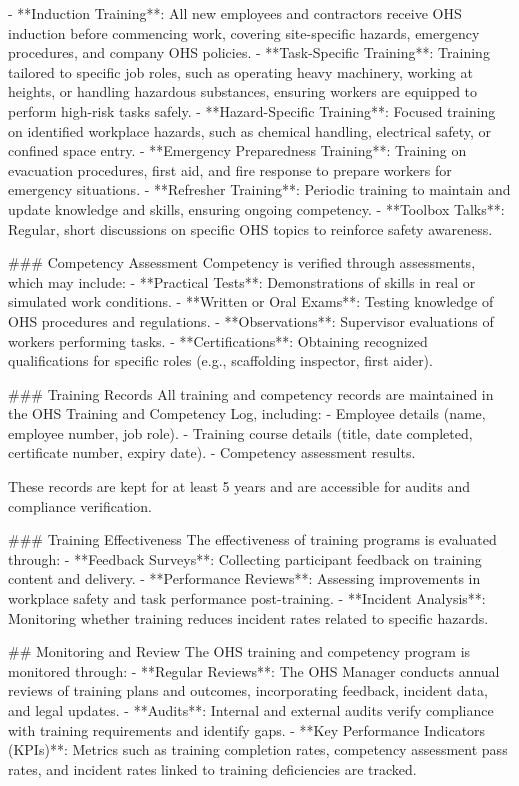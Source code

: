 \documentclass[11pt]{article}
\begin{document}
\begin{itemize}
{\begin{itemize}
- **Induction Training**: All new employees and contractors receive OHS induction before commencing work, covering site-specific hazards, emergency procedures, and company OHS policies.
- **Task-Specific Training**: Training tailored to specific job roles, such as operating heavy machinery, working at heights, or handling hazardous substances, ensuring workers are equipped to perform high-risk tasks safely.
- **Hazard-Specific Training**: Focused training on identified workplace hazards, such as chemical handling, electrical safety, or confined space entry.
- **Emergency Preparedness Training**: Training on evacuation procedures, first aid, and fire response to prepare workers for emergency situations.
- **Refresher Training**: Periodic training to maintain and update knowledge and skills, ensuring ongoing competency.
- **Toolbox Talks**: Regular, short discussions on specific OHS topics to reinforce safety awareness.

### Competency Assessment
Competency is verified through assessments, which may include:
- **Practical Tests**: Demonstrations of skills in real or simulated work conditions.
- **Written or Oral Exams**: Testing knowledge of OHS procedures and regulations.
- **Observations**: Supervisor evaluations of workers performing tasks.
- **Certifications**: Obtaining recognized qualifications for specific roles (e.g., scaffolding inspector, first aider).

### Training Records
All training and competency records are maintained in the OHS Training and Competency Log, including:
- Employee details (name, employee number, job role).
- Training course details (title, date completed, certificate number, expiry date).
- Competency assessment results.

These records are kept for at least 5 years and are accessible for audits and compliance verification.

### Training Effectiveness
The effectiveness of training programs is evaluated through:
- **Feedback Surveys**: Collecting participant feedback on training content and delivery.
- **Performance Reviews**: Assessing improvements in workplace safety and task performance post-training.
- **Incident Analysis**: Monitoring whether training reduces incident rates related to specific hazards.

## Monitoring and Review
The OHS training and competency program is monitored through:
- **Regular Reviews**: The OHS Manager conducts annual reviews of training plans and outcomes, incorporating feedback, incident data, and legal updates.
- **Audits**: Internal and external audits verify compliance with training requirements and identify gaps.
- **Key Performance Indicators (KPIs)**: Metrics such as training completion rates, competency assessment pass rates, and incident rates linked to training deficiencies are tracked.


\end{itemize}}
\end{itemize}
\end{document}
